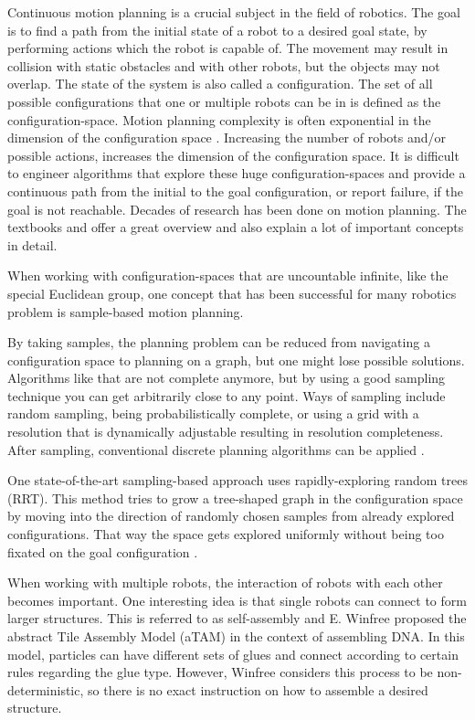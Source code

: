 Continuous motion planning is a crucial subject in the field of robotics.
The goal is to find a path from the initial state of a robot to a desired goal state, by performing actions which the robot is capable of.
The movement may result in collision with static obstacles and with other robots, but the objects may not overlap.
The state of the system is also called a configuration.
The set of all possible configurations that one or multiple robots can be in is defined as the configuration-space.
Motion planning complexity is often exponential in the dimension of the configuration space \cite{LaValle2006}.
Increasing the number of robots and/or possible actions, increases the dimension of the configuration space.
It is difficult to engineer algorithms that explore these huge configuration-spaces and provide a continuous path from the initial to the goal configuration, or report failure, if the goal is not reachable.
Decades of research has been done on motion planning.
The textbooks \cite{LaValle2006} and \cite{Mueller2019} offer a great overview and also explain a lot of important concepts in detail.

When working with configuration-spaces that are uncountable infinite, like the special Euclidean group, one concept that has been successful for many robotics problem is sample-based motion planning.

By taking samples, the planning problem can be reduced from navigating a configuration space to planning on a graph, but one might lose possible solutions.
Algorithms like that are not complete anymore, but by using a good sampling technique you can get arbitrarily close to any point.
Ways of sampling include random sampling, being probabilistically complete, or using a grid with a resolution that is dynamically adjustable resulting in resolution completeness.
After sampling, conventional discrete planning algorithms can be applied \cite{LaValle2006}.

One state-of-the-art sampling-based approach uses rapidly-exploring random trees (RRT).
This method tries to grow a tree-shaped graph in the configuration space by moving into the direction of randomly chosen samples from already explored configurations. That way the space gets explored uniformly without being too fixated on the goal configuration \cite{lavalle1998,lavalle2001}.

When working with multiple robots, the interaction of robots with each other becomes important.
One interesting idea is that single robots can connect to form larger structures.
This is referred to as self-assembly and E. Winfree \cite{winfree1998} proposed the abstract Tile Assembly Model (aTAM) in the context of assembling DNA.
In this model, particles can have different sets of glues and connect according to certain rules regarding the glue type.
However, Winfree considers this process to be non-deterministic, so there is no exact instruction on how to assemble a desired structure.

